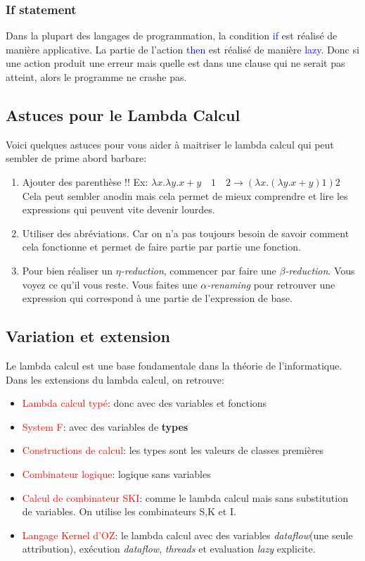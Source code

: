 \documentclass{report}
\begin{document}
\subsubsection{If statement}
Dans la plupart des langages de programmation, la condition \textcolor{blue}{if} est réalisé de manière applicative. La partie de l'action \textcolor{blue}{then} est réalisé de manière \textcolor{blue}{lazy}. Donc si une action produit une erreur mais quelle est dans une clause qui ne serait pas atteint, alors le programme ne crashe pas.

\subsection{Astuces pour le Lambda Calcul}
Voici quelques astuces pour vous aider à maitriser le lambda calcul qui peut sembler de prime abord barbare:
\begin{enumerate}
\item Ajouter des parenthèse !! Ex: $\lambda x.\lambda y.x + y \quad 1 \quad 2 \rightarrow (\lambda x.(\lambda y.x+y)1)2$ Cela peut sembler anodin mais cela permet de mieux comprendre et lire les expressions qui peuvent vite devenir lourdes.
\item Utiliser des abréviations. Car on n'a pas toujours besoin de savoir comment cela fonctionne et permet de faire partie par partie une fonction.
\item Pour bien réaliser un $\eta$\textit{-reduction}, commencer par faire une $\beta$\textit{-reduction}. Vous voyez ce qu'il vous reste. Vous faites une $\alpha$\textit{-renaming} pour retrouver une expression qui correspond à une partie de l'expression de base.
\end{enumerate}

\subsection{Variation et extension}
Le lambda calcul est une base fondamentale dans la théorie de l'informatique. Dans les extensions du lambda calcul, on retrouve:
\begin{itemize}
\item \textcolor{red}{Lambda calcul typé}: donc avec des variables et fonctions
\item \textcolor{red}{System F}: avec des variables de \textbf{types}
\item \textcolor{red}{Constructions de calcul}: les types sont les valeurs de classes premières
\item \textcolor{red}{Combinateur logique}: logique sans variables
\item \textcolor{red}{Calcul de combinateur SKI}: comme le lambda calcul mais sans substitution de variables. On utilise les combinateurs S,K et I.
\item \textcolor{red}{Langage Kernel d'OZ}: le lambda calcul avec des variables \textit{dataflow}(une seule attribution), exécution \textit{dataflow}, \textit{threads} et evaluation \textit{lazy} explicite.
\end{itemize}
\end{document}
